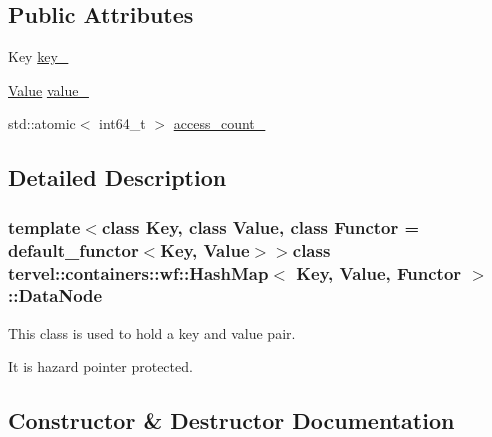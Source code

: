 \subsection*{Public Attributes}
\begin{DoxyCompactItemize}
\item 
Key \hyperlink{classtervel_1_1containers_1_1wf_1_1_hash_map_1_1_data_node_a261f271577727ee5699af49fdaaa989a}{key\+\_\+}
\item 
\hyperlink{hash__map_2test_object_8h_ad777bf08d8e2b01df17ba5e3c51ae11f}{Value} \hyperlink{classtervel_1_1containers_1_1wf_1_1_hash_map_1_1_data_node_a92498a88201109a8cababeff699435a6}{value\+\_\+}
\item 
std\+::atomic$<$ int64\+\_\+t $>$ \hyperlink{classtervel_1_1containers_1_1wf_1_1_hash_map_1_1_data_node_ab90537febd882ad210231df69691acae}{access\+\_\+count\+\_\+}
\end{DoxyCompactItemize}


\subsection{Detailed Description}
\subsubsection*{template$<$class Key, class Value, class Functor = default\+\_\+functor$<$\+Key, Value$>$$>$class tervel\+::containers\+::wf\+::\+Hash\+Map$<$ Key, Value, Functor $>$\+::\+Data\+Node}

This class is used to hold a key and value pair. 

It is hazard pointer protected. 

\subsection{Constructor \& Destructor Documentation}
\hypertarget{classtervel_1_1containers_1_1wf_1_1_hash_map_1_1_data_node_ada4006f1254608301c4c19a08efc9f91}{}
